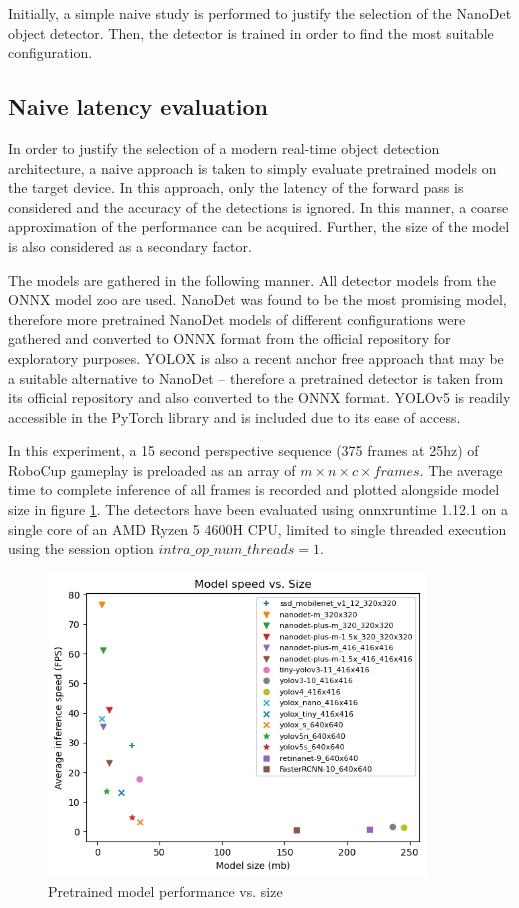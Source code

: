 \documentclass[a4paper,twoside,12pt]{report}
\begin{document}
Initially, a simple naive study is performed to justify the selection of the NanoDet object detector. Then, the detector is trained in order to find the most suitable configuration.

\subsection{Naive latency evaluation}
In order to justify the selection of a modern real-time object detection architecture, a naive approach is taken to simply evaluate pretrained models on the target device. In this approach, only the latency of the forward pass is considered and the accuracy of the detections is ignored. In this manner, a coarse approximation of the performance can be acquired. Further, the size of the model is also considered as a secondary factor.

The models are gathered in the following manner. All detector models from the ONNX model zoo \cite{modelzoo} are used. NanoDet was found to be the most promising model, therefore more pretrained NanoDet models of different configurations were gathered and converted to ONNX format from the official repository for exploratory purposes. YOLOX \citep{yolox} is also a recent anchor free approach that may be a suitable alternative to NanoDet -- therefore a pretrained detector is taken from its official repository \citep{yoloxrepo} and also converted to the ONNX format. YOLOv5 is readily accessible in the PyTorch library and is included due to its ease of access. 

In this experiment, a 15 second perspective sequence (375 frames at 25hz) of RoboCup gameplay is preloaded as an array of $m \times n \times c \times frames$. The average time to complete inference of all frames is recorded and plotted alongside model size in figure \ref{fig:modelspeedsize}. The detectors have been evaluated using onnxruntime 1.12.1 on a single core of an AMD Ryzen 5 4600H CPU, limited to single threaded execution using the session option $intra\_op\_num\_threads = 1$. 

\begin{figure}[h!]
\begin{center}
\includegraphics[width=10cm]{images/modelspeedsize.png}
\caption{Pretrained model performance vs. size}
\label{fig:modelspeedsize}
\end{center}
\end{figure}
\end{document}
